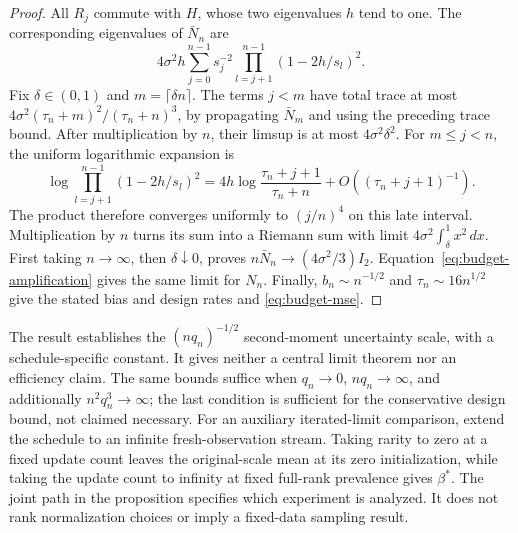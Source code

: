 \begin{proof}
 All $R_j$ commute with $H$, whose two eigenvalues $h$ tend to one. The
 corresponding eigenvalues of $\bar N_n$ are
 \[
  4\sigma^2h\sum_{j=0}^{n-1}s_j^{-2} \prod_{l=j+1}^{n-1}(1 - 2h/s_l)^2.
 \]
 Fix $\delta \in (0,1)$ and $m = \lceil\delta n\rceil$. The terms $j < m$ have
 total trace at most $4\sigma^2(\tau_n + m)^2/(\tau_n + n)^3$, by propagating
 $\bar N_m$ and using the preceding trace bound. After multiplication by $n$,
 their limsup is at most $4\sigma^2\delta^2$. For $m \le j < n$, the uniform
 logarithmic expansion is
 \[
  \log\prod_{l=j+1}^{n-1}(1 - 2h/s_l)^2 = 4h\log\frac{\tau_n + j + 1}{\tau_n + n}
                                          + O((\tau_n + j + 1)^{-1}).
 \]
 The product therefore converges uniformly to $(j/n)^4$ on this late interval.
 Multiplication by $n$ turns its sum into a Riemann sum with limit
 $4\sigma^2\int_\delta^1 x^2\,dx$. First taking $n \to \infty$, then
 $\delta \downarrow 0$, proves $n\bar N_n \to (4\sigma^2/3)I_2$.
 Equation~\eqref{eq:budget-amplification} gives the same limit for $N_n$.
 Finally, $b_n \sim n^{-1/2}$ and $\tau_n \sim 16n^{1/2}$ give the stated bias
 and design rates and \eqref{eq:budget-mse}.
\end{proof}

The result establishes the $(nq_n)^{-1/2}$ second-moment uncertainty scale, with
a schedule-specific constant. It gives neither a central limit theorem nor an
efficiency claim. The same bounds suffice when $q_n \to 0$, $nq_n \to \infty$,
and additionally $n^2q_n^3 \to \infty$; the last condition is sufficient for the
conservative design bound, not claimed necessary. For an auxiliary
iterated-limit comparison, extend the schedule to an infinite fresh-observation
stream. Taking rarity to zero at a fixed update count leaves the original-scale
mean at its zero initialization, while taking the update count to infinity at
fixed full-rank prevalence gives $\beta^*$. The joint path in the proposition
specifies which experiment is analyzed. It does not rank normalization choices
or imply a fixed-data sampling result.
